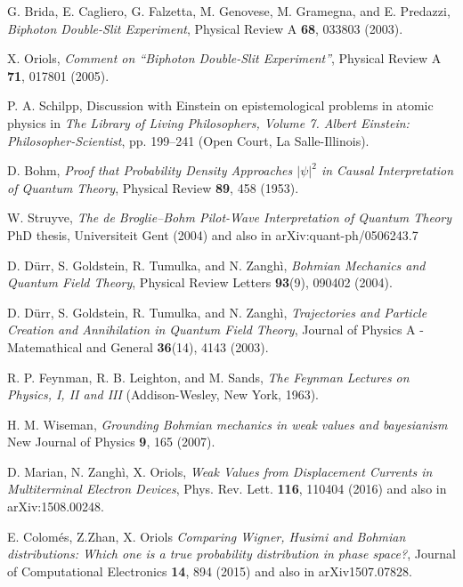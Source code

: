 \documentclass[nofootinbib, secnumarabic, amsmath, nobibnotes,11pt,aps,pra, floatfix]{revtex4-1}
\begin{document}
\begin{thebibliography}{999}
G. Brida, E. Cagliero, G. Falzetta, M. Genovese, M. Gramegna, and E. Predazzi, \emph{Biphoton Double-Slit Experiment}, Physical Review A \textbf{68},  033803 (2003).

X. Oriols, \emph{Comment on ``Biphoton Double-Slit Experiment''}, Physical Review A \textbf{71},  017801 (2005).


P. A. Schilpp, Discussion with Einstein on epistemological problems in atomic physics in \emph{The Library of Living Philosophers, Volume 7. Albert Einstein: Philosopher-Scientist}, pp. 199--241 (Open Court, La Salle-Illinois).

D. Bohm, \emph{Proof that Probability Density Approaches $|\psi|^2$ in Causal Interpretation of Quantum Theory}, Physical Review \textbf{89},  458 (1953).

W. Struyve, \emph{The de Broglie--Bohm Pilot-Wave Interpretation of Quantum Theory} PhD thesis, Universiteit Gent (2004) and also in arXiv:quant-ph/0506243.7

D. D\"{u}rr, S. Goldstein, R. Tumulka, and N. Zangh\`i, \emph{Bohmian Mechanics and Quantum Field Theory}, Physical Review Letters \textbf{93}(9),  090402 (2004).

D. D\"{u}rr, S. Goldstein, R. Tumulka, and N. Zangh\`i, \emph{Trajectories and Particle Creation and Annihilation in Quantum Field Theory}, Journal of Physics A - Matemathical and General \textbf{36}(14),  4143 (2003).

 R. P. Feynman, R. B. Leighton, and M. Sands, \emph{The Feynman Lectures on Physics, I, II and III} (Addison-Wesley, New York, 1963).

H. M. Wiseman, \emph{Grounding Bohmian mechanics in weak values and bayesianism}  New Journal of Physics \textbf{9},   165 (2007). 

D. Marian, N. Zangh\`i, X. Oriols, \emph{Weak Values from Displacement Currents in Multiterminal Electron Devices}, Phys. Rev. Lett. {\bf 116},  110404 (2016) and also in arXiv:1508.00248.  

E. Colom\'{e}s, Z.Zhan, X. Oriols \emph{Comparing Wigner, Husimi and Bohmian distributions: Which one is a true probability distribution in phase space?}, Journal of Computational Electronics {\bf 14},  894 (2015) and also in arXiv1507.07828.  


\end{thebibliography}
\end{document}
